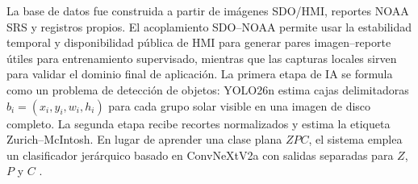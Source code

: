 \documentclass[a4paper,twocolumn,11pt]{article}
\begin{document}
La base de datos fue construida a partir de imágenes SDO/HMI, reportes NOAA SRS y registros propios. El acoplamiento SDO--NOAA permite usar la estabilidad temporal y disponibilidad pública de HMI para generar pares imagen--reporte útiles para entrenamiento supervisado, mientras que las capturas locales sirven para validar el dominio final de aplicación. La primera etapa de IA se formula como un problema de detección de objetos: YOLO26n estima cajas delimitadoras $b_i=(x_i,y_i,w_i,h_i)$ para cada grupo solar visible en una imagen de disco completo. La segunda etapa recibe recortes normalizados y estima la etiqueta Zurich--McIntosh. En lugar de aprender una clase plana $ZPC$, el sistema emplea un clasificador jerárquico basado en ConvNeXtV2a con salidas separadas para $Z$, $P$ y $C$ \citep{scherrer2012hmi,bobra2014sharp,noaaSRS,ultralyticsYOLO26,woo2023convnextv2}.
\end{document}
